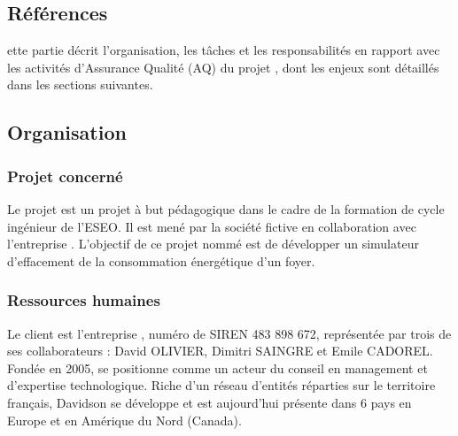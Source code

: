 \documentclass[a4paper,11pt,titlepage]{article}
\newcounter{subsubsubsection}[subsubsection]
\begin{document}
\newpage
\subsection{Références} %
\nocite{*} %
\begingroup
\renewcommand{\section}[2]{}


\endgroup

\newpage
\section{Gestion}%
Cette partie décrit l'organisation, les tâches et les responsabilités en rapport avec les activités d'Assurance Qualité (AQ) du projet \projectName, dont les enjeux sont détaillés dans les sections suivantes.
\subsection{Organisation}%

\subsubsection{Projet concerné}%
Le projet {\projectName} est un projet à but pédagogique dans le cadre de la formation de cycle ingénieur de l'ESEO. Il est mené par la société fictive {\teamCompany} en collaboration avec l'entreprise {\clientName}. L'objectif de ce projet nommé {\projectName} est de développer un simulateur d'effacement de la consommation énergétique d'un foyer.

\subsubsection{Ressources humaines}%



Le client est l'entreprise {\clientName}, numéro de SIREN 483 898 672, représentée par trois de ses collaborateurs : David OLIVIER, Dimitri SAINGRE et Emile CADOREL. \\

Fondée en 2005, {\clientName} se positionne comme un acteur du conseil en management et d'expertise technologique. Riche d'un réseau d'entités réparties sur le territoire français, Davidson se développe et est aujourd'hui présente dans 6 pays en Europe et en Amérique du Nord (Canada).
\end{document}
